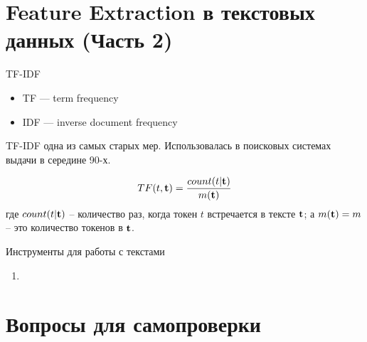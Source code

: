 \section{Feature Extraction в текстовых данных (Часть 2)}\label{section:texts_fe2}

\begin{frame}{TF-IDF}
	\begin{itemize}
		\item TF — term frequency
		\item IDF — inverse document frequency
	\end{itemize}
	TF-IDF одна из самых старых  мер.
	Использовалась в поисковых системах выдачи в середине 90-х.
	
	\begin{equation}
	TF(t, \bold t) = \frac{count(t|\bold t)}{m(\bold t)}
	\end{equation}
	где $count(t|\bold t)$ -- 
	количество раз, когда токен $t$
	встречается в тексте $\bold t$;
	а $m(\bold t)=m$ -- это количество токенов в $\bold t$.
	
	
	
\end{frame}

\begin{frame}{Инструменты для работы с текстами}
	\begin{enumerate}
		\item
	\end{enumerate}

\end{frame}


\section{Вопросы для самопроверки}


